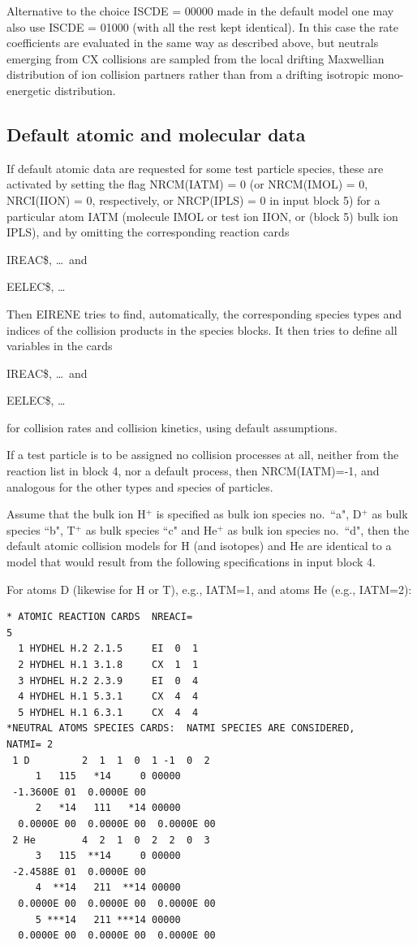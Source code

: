 Alternative to the choice ISCDE = 00000 made in the default model one may also
use ISCDE = 01000 (with all the rest kept identical).
In this case the rate coefficients are evaluated in the same way as described
above, but neutrals emerging from CX collisions are sampled from the local
drifting Maxwellian distribution of ion collision partners rather than from a
drifting isotropic mono-energetic distribution.

\subsection{Default atomic and molecular data}

If default atomic data are requested for some test particle species, these are
activated by setting the flag  NRCM(IATM) = 0 (or NRCM(IMOL) = 0, NRCI(IION) =
0, respectively, or NRCP(IPLS) = 0 in input block 5) for a particular atom IATM
(molecule IMOL or test ion IION, or (block 5) bulk ion IPLS), and by omitting
the corresponding reaction cards 

IREAC\$, \dots\ and 

EELEC\$, \dots 

Then EIRENE tries to find, automatically, the corresponding species types and
indices of the collision products in the species blocks.
It then tries to define all variables in the cards 

IREAC\$, \dots\ and 

EELEC\$, \dots 

for collision rates and collision kinetics, using default assumptions.

If a test particle is to be assigned no collision processes at all, neither
from the reaction list in block 4, nor a default process, then NRCM(IATM)=-1,
and analogous for the other types and species of particles.


Assume that the bulk ion H$^+$ is specified as bulk ion species no.\ ``a",
D$^+$ as bulk species ``b", T$^+$ as bulk species ``c" and He$^+$ as bulk ion
species no.\ ``d", then the default atomic collision models for H  (and
isotopes) and He are identical to a model that would result from the following
specifications in input block 4.

For atoms D (likewise for H or T), e.g., IATM=1, and atoms He (e.g., IATM=2):

\begin{lstlisting}
* ATOMIC REACTION CARDS  NREACI=
5
  1 HYDHEL H.2 2.1.5     EI  0  1
  2 HYDHEL H.1 3.1.8     CX  1  1
  3 HYDHEL H.2 2.3.9     EI  0  4
  4 HYDHEL H.1 5.3.1     CX  4  4
  5 HYDHEL H.1 6.3.1     CX  4  4
*NEUTRAL ATOMS SPECIES CARDS:  NATMI SPECIES ARE CONSIDERED,
NATMI= 2
 1 D         2  1  1  0  1 -1  0  2
     1   115   *14     0 00000
 -1.3600E 01  0.0000E 00
     2   *14   111   *14 00000
  0.0000E 00  0.0000E 00  0.0000E 00
 2 He        4  2  1  0  2  2  0  3
     3   115  **14     0 00000
 -2.4588E 01  0.0000E 00
     4  **14   211  **14 00000
  0.0000E 00  0.0000E 00  0.0000E 00
     5 ***14   211 ***14 00000
  0.0000E 00  0.0000E 00  0.0000E 00
\end{lstlisting}

